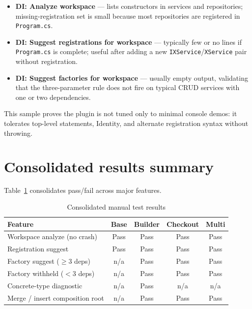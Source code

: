 \begin{itemize}
	\item \textbf{DI: Analyze workspace} --- lists constructors in services and repositories; missing-registration set is small because most repositories are registered in \texttt{Program.cs}.
	\item \textbf{DI: Suggest registrations for workspace} --- typically few or no lines if \texttt{Program.cs} is complete; useful after adding a new \texttt{IXService}/\texttt{XService} pair without registration.
	\item \textbf{DI: Suggest factories for workspace} --- usually empty output, validating that the three-parameter rule does not fire on typical CRUD services with one or two dependencies.
\end{itemize}

This sample proves the plugin is not tuned only to minimal console demos: it tolerates top-level statements, Identity, and alternate registration syntax without throwing.

\section{Consolidated results summary}
\label{chap5:summary-table}

Table~\ref{tab:consolidated-results} consolidates pass/fail across major features.

\begin{table}[htbp]
\centering
\caption{Consolidated manual test results}
\label{tab:consolidated-results}
\small
\begin{tabular}{|l|c|c|c|c|}
\hline
\textbf{Feature} & \textbf{Base} & \textbf{Builder} & \textbf{Checkout} & \textbf{Multi} \\
\hline
Workspace analyze (no crash) & Pass & Pass & Pass & Pass \\
\hline
Registration suggest & Pass & Pass & Pass & Pass \\
\hline
Factory suggest ($\geq 3$ deps) & n/a & Pass & Pass & Pass \\
\hline
Factory withheld ($< 3$ deps) & n/a & Pass & Pass & Pass \\
\hline
Concrete-type diagnostic & n/a & Pass & n/a & n/a \\
\hline
Merge / insert composition root & n/a & Pass & Pass & Pass \\
\hline
\end{tabular}
\end{table}

